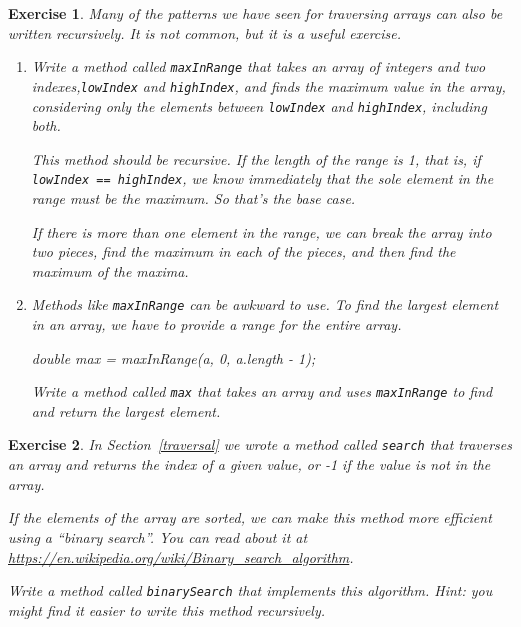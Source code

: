\documentclass[12pt]{book}
\theoremstyle{exercise}
\newtheorem{exercise}{Exercise}[chapter]
\newcommand{\java}[1]{\verb"#1"}
\begin{document}
\begin{exercise}
Many of the patterns we have seen for traversing arrays can also be written recursively.
It is not common, but it is a useful exercise.

\begin{enumerate}

\item Write a method called \java{maxInRange} that takes an array of integers and two indexes,\java{lowIndex} and \java{highIndex}, and finds the maximum value in the array, considering only the elements between \java{lowIndex} and \java{highIndex}, including both.

This method should be recursive.
If the length of the range is 1, that is, if \java{lowIndex == highIndex}, we know immediately that the sole element in the range must be the maximum.
So that's the base case.

If there is more than one element in the range, we can break the array into two pieces, find the maximum in each of the pieces, and then find the maximum of the maxima.

\item Methods like \java{maxInRange} can be awkward to use.
To find the largest element in an array, we have to provide a range for the entire array.

\begin{code}
    double max = maxInRange(a, 0, a.length - 1);
\end{code}

Write a method called \java{max} that takes an array and uses \java{maxInRange} to find and return the largest element.

\end{enumerate}
\end{exercise}


\begin{exercise}

In Section~\ref{traversal} we wrote a method called \java{search} that traverses an array and returns the index of a given value, or -1 if the value is not in the array.

If the elements of the array are sorted, we can make this method more efficient using a ``binary search''.
You can read about it at \url{https://en.wikipedia.org/wiki/Binary_search_algorithm}.

Write a method called \java{binarySearch} that implements this algorithm.
Hint: you might find it easier to write this method recursively.

\end{exercise}
\end{document}

